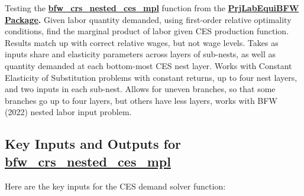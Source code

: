 \documentclass[
]{book}
\begin{document}
Testing the
\href{https://github.com/FanWangEcon/PrjLabEquiBFW/blob/main/PrjLabEquiBFW/solvedemand/bfw_crs_nested_ces_mpl.m}{\textbf{bfw\_crs\_nested\_ces\_mpl}}
function from the \href{https://fanwangecon.github.io/PrjLabEquiBFW/}{\textbf{PrjLabEquiBFW
Package}}\textbf{.} Given
labor quantity demanded, using first-order relative optimality
conditions, find the marginal product of labor given CES production
function. Results match up with correct relative wages, but not wage
levels. Takes as inputs share and elasticity parameters across layers of
sub-nests, as well as quantity demanded at each bottom-most CES nest
layer. Works with Constant Elasticity of Substitution problems with
constant returns, up to four nest layers, and two inputs in each
sub-nest. Allows for uneven branches, so that some branches go up to
four layers, but others have less layers, works with BFW (2022) nested
labor input problem.

\hypertarget{key-inputs-and-outputs-for-bfw_crs_nested_ces_mpl}{%
\subsection{\texorpdfstring{Key Inputs and Outputs for \href{https://github.com/FanWangEcon/PrjLabEquiBFW/blob/main/PrjLabEquiBFW/solvedemand/bfw_crs_nested_ces_mpl.m}{\textbf{bfw\_crs\_nested\_ces\_mpl}}}{Key Inputs and Outputs for bfw\_crs\_nested\_ces\_mpl}}\label{key-inputs-and-outputs-for-bfw_crs_nested_ces_mpl}}

Here are the key inputs for the CES demand solver function:
\end{document}
